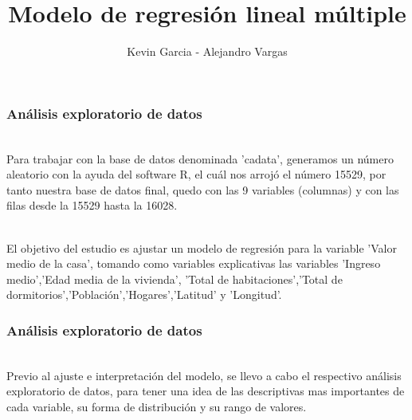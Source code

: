 \documentclass[12pt]{beamer}
\author{Kevin Garcia - Alejandro Vargas}
\title{Modelo de regresión lineal múltiple}
\begin{document}
\begin{frame}
\titlepage
\end{frame}


\begin{frame}
\frametitle{Análisis exploratorio de datos}
~\\ Para trabajar con la base de datos denominada 'cadata', generamos un número aleatorio con la ayuda del software R, el cuál nos arrojó el número 15529, por tanto nuestra base de datos final, quedo con las 9 variables (columnas) y con las filas desde la 15529 hasta la 16028.

~\\ El objetivo del estudio es ajustar un modelo de regresión para la variable 'Valor medio de la casa', tomando como variables explicativas las variables 'Ingreso medio','Edad media de la vivienda', 'Total de habitaciones','Total de dormitorios','Población','Hogares','Latitud' y 'Longitud'. 
\end{frame}

\begin{frame}
\frametitle{Análisis exploratorio de datos}
~\\ Previo al ajuste e interpretación del modelo, se llevo a cabo el respectivo análisis exploratorio de datos, para tener una idea de las descriptivas mas importantes de cada variable, su forma de distribución y su rango de valores.
\end{frame}
\end{document}
